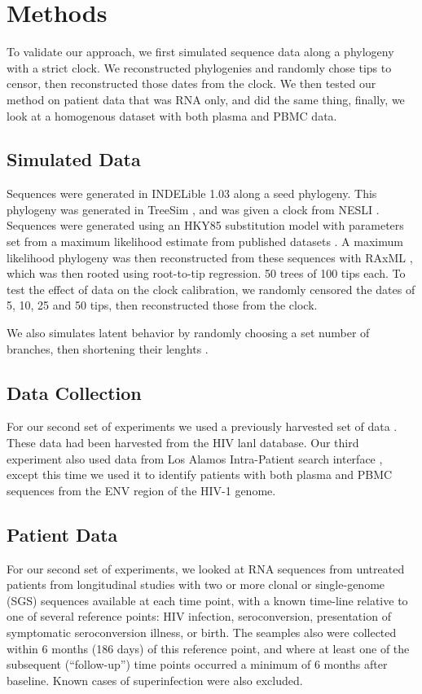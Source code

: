 \section{Methods} \label{sec:methods}
To validate our approach, we first simulated sequence data along a phylogeny with a strict clock. We reconstructed phylogenies and randomly chose tips to censor, then reconstructed those dates from the clock. We then tested our method on patient data that was RNA only, and did the same thing, finally, we look at a homogenous dataset with both plasma and PBMC data. 

\subsection{Simulated Data} \label{subsec:simdata}
Sequences were generated in INDELible 1.03 \citep{Indelible09} along a seed phylogeny. This phylogeny was generated in TreeSim \citep{TreeSim}, and was given a clock from NESLI \citep{NELSI}. Sequences were generated using an HKY85 substitution model with parameters set from a maximum likelihood estimate from published datasets \citep{McCloskey14}. A maximum likelihood phylogeny was then reconstructed from these sequences with RAxML \citep{Raxml14}, which was then rooted using root-to-tip regression. 50 trees of 100 tips each. To test the effect of data on the clock calibration, we randomly censored the dates of 5, 10, 25 and 50 tips, then reconstructed those from the clock.

We also simulates latent behavior by randomly choosing a set number of branches, then shortening their lenghts \citep{Immonen14}.


\subsection{Data Collection} \label{subsec:dcollection}
For our second set of experiments we used a previously harvested set of data \citep{McCloskey14}. These data had been harvested from the HIV lanl database. Our third experiment also used data from Los Alamos Intra-Patient search interface \citep{LosAlamos}, except this time we used it to identify patients with both plasma and PBMC sequences from the ENV region of the HIV-1 genome. 

\subsection{Patient Data} \label{subsec:patdata}
 For our second set of experiments, we looked at RNA sequences from untreated patients from longitudinal studies with two or more clonal or single-genome (SGS) sequences available at each time point, with a known time-line relative to one of several reference points: HIV infection, seroconversion, presentation of symptomatic seroconversion illness, or birth. The seamples also were collected within 6 months (186 days) of this reference point, and where at least one of the subsequent (“follow-up”) time points occurred a minimum of 6 months after baseline. Known cases of superinfection were also excluded. 
 
